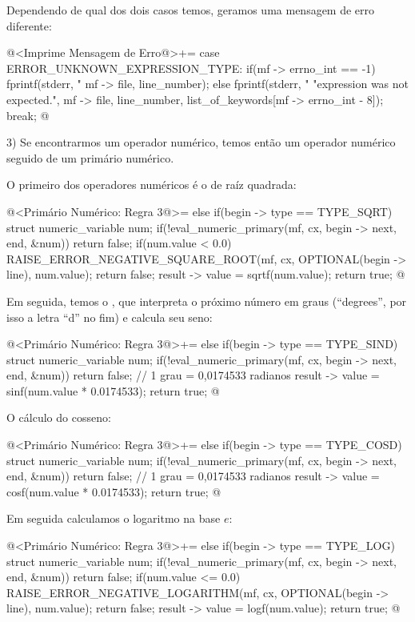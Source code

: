 Dependendo de qual dos dois casos temos, geramos uma mensagem de erro
diferente:

\iniciocodigo
@<Imprime Mensagem de Erro@>+=
case ERROR_UNKNOWN_EXPRESSION_TYPE:
  if(mf -> errno_int == -1)
    fprintf(stderr, "%
            mf -> file, line_number);
  else
    fprintf(stderr, "%
                    "expression was not expected.", mf -> file, line_number,
                    list_of_keywords[mf -> errno_int - 8]);
  break;
@
\fimcodigo

3) Se encontrarmos um operador numérico, temos então um operador
numérico seguido de um primário numérico.

O primeiro dos operadores numéricos é o de raíz quadrada:

\iniciocodigo
@<Primário Numérico: Regra 3@>=
else if(begin -> type == TYPE_SQRT){
  struct numeric_variable num;
  if(!eval_numeric_primary(mf, cx, begin -> next, end, &num))
    return false;
  if(num.value < 0.0){
    RAISE_ERROR_NEGATIVE_SQUARE_ROOT(mf, cx, OPTIONAL(begin -> line),
                                    num.value);
    return false;
  }
  result -> value = sqrtf(num.value);
  return true;
}
@
\fimcodigo

Em seguida, temos o , que interpreta o próximo número
em graus (``degrees'', por isso a letra ``d'' no fim) e calcula seu
seno:

\iniciocodigo
@<Primário Numérico: Regra 3@>+=
else if(begin -> type == TYPE_SIND){
  struct numeric_variable num;
  if(!eval_numeric_primary(mf, cx, begin -> next, end, &num))
    return false;
  // 1 grau = 0,0174533 radianos
  result -> value = sinf(num.value * 0.0174533);
  return true;
}
@
\fimcodigo

O cálculo do cosseno:

\iniciocodigo
@<Primário Numérico: Regra 3@>+=
else if(begin -> type == TYPE_COSD){
  struct numeric_variable num;
  if(!eval_numeric_primary(mf, cx, begin -> next, end, &num))
    return false;
  // 1 grau = 0,0174533 radianos
  result -> value = cosf(num.value * 0.0174533);
  return true;
}
@
\fimcodigo

Em seguida calculamos o logaritmo na base $e$:

\iniciocodigo
@<Primário Numérico: Regra 3@>+=
else if(begin -> type == TYPE_LOG){
  struct numeric_variable num;
  if(!eval_numeric_primary(mf, cx, begin -> next, end, &num))
    return false;
  if(num.value <= 0.0){
    RAISE_ERROR_NEGATIVE_LOGARITHM(mf, cx, OPTIONAL(begin -> line),
                                   num.value);
    return false;
  }
  result -> value = logf(num.value);
  return true;
}
@
\fimcodigo

